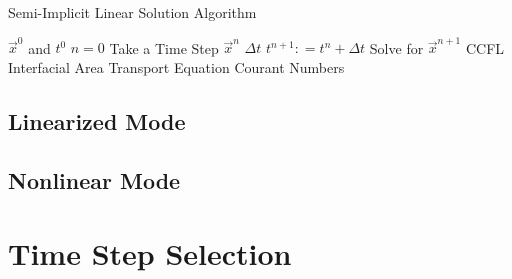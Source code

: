 \begin{algo}[H]
\caption{Semi-Implicit Linear Solution Algorithm}
\label{algo:semi_implicit}
\setlength{\baselineskip}{0.625\baselineskip}
\begin{algorithmic}[1]
\Require $\Vec{x}^{0}$ and $t^{0}$
\Set $n = 0$
\Loop \; Take a Time Step
    \Set $\vec{x}^{n}$        
    \Calculate $\Delta t$ 
    \State $t^{n+1} : = t^{n} + \Delta t$
    \BlackBox Solve for $\vec{x}^{n+1}$ 
    \Test CCFL 
    \BlackBox Interfacial Area Transport Equation
    \Calculate Courant Numbers 
\end{algorithmic}
\end{algo}

\subsection{Linearized Mode}
\label{subsect:solution_linear}


\subsection{Nonlinear Mode}
\label{subsect:solution_nonlinear}

\section{Time Step Selection}
\label{sect:time_step_selection}

